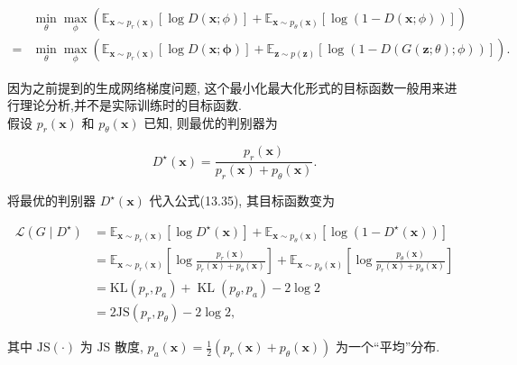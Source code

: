 \documentclass[10pt]{article}
\begin{document}
\begin{align*}
& \min _{\theta} \max _{\phi}\left(\mathbb{E}_{\boldsymbol{x} \sim p_{r}(\boldsymbol{x})}[\log D(\boldsymbol{x} ; \phi)]+\mathbb{E}_{\boldsymbol{x} \sim p_{\theta}(\boldsymbol{x})}[\log (1-D(\boldsymbol{x} ; \phi))]\right)  \tag{13.35}\\
= & \min _{\theta} \max _{\phi}\left(\mathbb{E}_{\boldsymbol{x} \sim p_{r}(\boldsymbol{x})}[\log D(\boldsymbol{x} ; \boldsymbol{\phi})]+\mathbb{E}_{\boldsymbol{z} \sim p(\boldsymbol{z})}[\log (1-D(G(\boldsymbol{z} ; \theta) ; \phi))]\right) . \tag{13.36}
\end{align*}


因为之前提到的生成网络梯度问题, 这个最小化最大化形式的目标函数一般用来进行理论分析,并不是实际训练时的目标函数.\\
假设 $p_{r}(\boldsymbol{x})$ 和 $p_{\theta}(\boldsymbol{x})$ 已知, 则最优的判别器为


\begin{equation*}
D^{\star}(\boldsymbol{x})=\frac{p_{r}(\boldsymbol{x})}{p_{r}(\boldsymbol{x})+p_{\theta}(\boldsymbol{x})} . \tag{13.37}
\end{equation*}


将最优的判别器 $D^{\star}(\boldsymbol{x})$ 代入公式(13.35), 其目标函数变为


\begin{align*}
\mathcal{L}\left(G \mid D^{\star}\right) & =\mathbb{E}_{\boldsymbol{x} \sim p_{r}(\boldsymbol{x})}\left[\log D^{\star}(\boldsymbol{x})\right]+\mathbb{E}_{\boldsymbol{x} \sim p_{\theta}(\boldsymbol{x})}\left[\log \left(1-D^{\star}(\boldsymbol{x})\right)\right]  \tag{13.38}\\
& =\mathbb{E}_{\boldsymbol{x} \sim p_{r}(\boldsymbol{x})}\left[\log \frac{p_{r}(\boldsymbol{x})}{p_{r}(\boldsymbol{x})+p_{\theta}(\boldsymbol{x})}\right]+\mathbb{E}_{\boldsymbol{x} \sim p_{\theta}(\boldsymbol{x})}\left[\log \frac{p_{\theta}(\boldsymbol{x})}{p_{r}(\boldsymbol{x})+p_{\theta}(\boldsymbol{x})}\right]  \tag{13.39}\\
& =\mathrm{KL}\left(p_{r}, p_{a}\right)+\operatorname{KL}\left(p_{\theta}, p_{a}\right)-2 \log 2  \tag{13.40}\\
& =2 \mathrm{JS}\left(p_{r}, p_{\theta}\right)-2 \log 2, \tag{13.41}
\end{align*}


其中 $\mathrm{JS}(\cdot)$ 为 $\mathrm{JS}$ 散度, $p_{a}(\boldsymbol{x})=\frac{1}{2}\left(p_{r}(\boldsymbol{x})+p_{\theta}(\boldsymbol{x})\right)$ 为一个“平均”分布.
\end{document}
